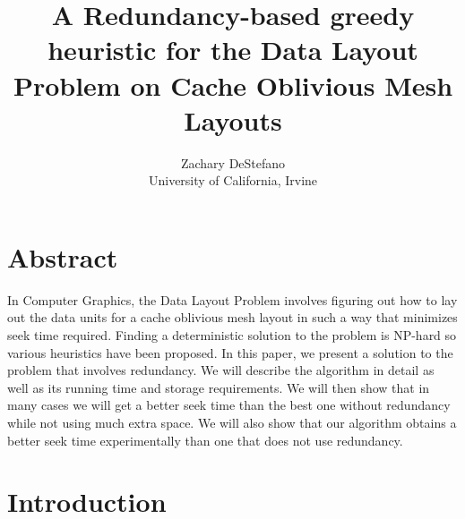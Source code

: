 \documentclass[11pt,psfig]{article}
\begin{document}
\setlength{\parskip}{1.2ex plus0.3ex minus 0.3ex}


\thispagestyle{empty} \pagestyle{myheadings} 



\title{A Redundancy-based greedy heuristic for the Data Layout Problem on Cache Oblivious Mesh Layouts}
\author{Zachary DeStefano\\ University of California, Irvine}

\maketitle

\vfill\eject

\section*{Abstract}

In Computer Graphics, the Data Layout Problem involves figuring out how to lay out the data units for a cache oblivious mesh layout in such a way that minimizes seek time required. Finding a deterministic solution to the problem is NP-hard so various heuristics have been proposed. In this paper, we present a solution to the problem that involves redundancy. We will describe the algorithm in detail as well as its running time and storage requirements. We will then show that in many cases we will get a better seek time than the best one without redundancy while not using much extra space. We will also show that our algorithm obtains a better seek time experimentally than one that does not use redundancy. 

\section*{Introduction}
\end{document}
